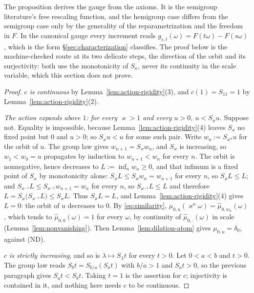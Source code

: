 The proposition derives the gauge from the axioms. It is the semigroup literature's free rescaling
function, and the hemigroup case differs from the semigroup case only by the generality of
the reparametrization and the freedom in $F$. In the canonical gauge every increment reads
$g_{s,t}(\omega) = F(t\omega) - F(s\omega)$, which is the form
\S\ref{sec:characterization} classifies. The proof below is the machine-checked route at its
two delicate steps, the direction of the orbit and its surjectivity: both use the
monotonicity of $S_\kappa$, never its continuity in the scale variable, which this section
does not prove.

\begin{proof}
\emph{$c$ is continuous} by Lemma~\ref{lem:action-rigidity}(3), and $c(1) = S_11 = 1$ by
Lemma~\ref{lem:action-rigidity}(2).

\emph{The action expands above $1$: for every $\varkappa > 1$ and every $u > 0$,
$u < S_\varkappa u$.} Suppose not. Equality is impossible, because
Lemma~\ref{lem:action-rigidity}(4) leaves $S_\varkappa$ no fixed point but $0$ and $u > 0$;
so $S_\varkappa u < u$ for some such pair. Write $w_n := S_{\varkappa^n}u$ for the orbit of
$u$. The group law gives $w_{n+1} = S_\varkappa w_n$, and $S_\varkappa$ is increasing, so
$w_1 < w_0 = u$ propagates by induction to $w_{n+1} < w_n$ for every $n$. The orbit is
nonnegative, hence decreases to $L := \inf_n w_n \ge 0$, and that infimum is a fixed point of
$S_\varkappa$ by monotonicity alone: $S_\varkappa L \le S_\varkappa w_n = w_{n+1}$ for every
$n$, so $S_\varkappa L \le L$; and $S_{\varkappa^{-1}}L \le S_{\varkappa^{-1}}w_{n+1} = w_n$
for every $n$, so $S_{\varkappa^{-1}}L \le L$ and therefore
$L = S_\varkappa\bigl(S_{\varkappa^{-1}}L\bigr) \le S_\varkappa L$. Thus $S_\varkappa L = L$,
and Lemma~\ref{lem:action-rigidity}(4) gives $L = 0$: the orbit of $u$ decreases to $0$. By
\ref{eq:similarity}, $\hat\mu_{0,u}(\varkappa^n\omega) = \hat\mu_{0,w_n}(\omega)$, which tends
to $\hat\mu_{0,0}(\omega) = 1$ for every $\omega$, by continuity of
$\hat\mu_{0,\cdot}(\omega)$ in scale (Lemma~\ref{lem:nonvanishing}). Then
Lemma~\ref{lem:dilation-atom} gives $\mu_{0,u} = \delta_0$, against (ND).

\emph{$c$ is strictly increasing}, and so is $\lambda \mapsto S_\lambda t$ for every $t > 0$.
Let $0 < a < b$ and $t > 0$. The group law reads $S_b t = S_{b/a}(S_a t)$ with $b/a > 1$ and
$S_a t > 0$, so the previous paragraph gives $S_a t < S_b t$. Taking $t = 1$ is the assertion
for $c$; injectivity is contained in it, and nothing here needs $c$ to be continuous.


\end{proof}
